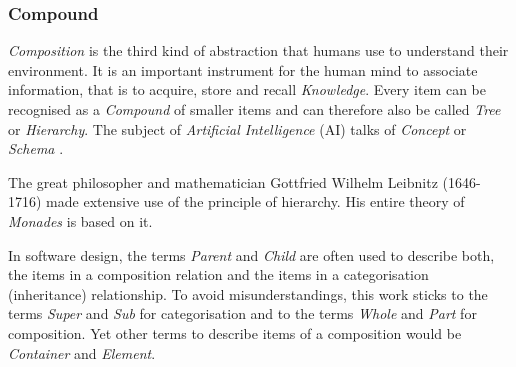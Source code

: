 %
%
%
%
%
%
%

\subsubsection{Compound}
\label{compound_heading}

\emph{Composition} is the third kind of abstraction that humans use to
understand their environment. It is an important instrument for the human mind
to associate information, that is to acquire, store and recall \emph{Knowledge}.
Every item can be recognised as a \emph{Compound} of smaller items and can
therefore also be called \emph{Tree} or \emph{Hierarchy}. The subject of
\emph{Artificial Intelligence} (AI) talks of \emph{Concept} or \emph{Schema}
\cite{sowa}.

The great philosopher and mathematician Gottfried Wilhelm Leibnitz (1646-1716)
made extensive use of the principle of hierarchy. His entire theory of
\emph{Monades} \cite{leibnitz} is based on it.

In software design, the terms \emph{Parent} and \emph{Child} are often used to
describe both, the items in a composition relation and the items in a
categorisation (inheritance) relationship. To avoid misunderstandings, this
work sticks to the terms \emph{Super} and \emph{Sub} for categorisation and to
the terms \emph{Whole} and \emph{Part} for composition. Yet other terms to
describe items of a composition would be \emph{Container} and \emph{Element}.

